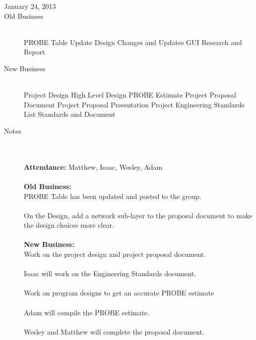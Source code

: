 \documentclass[11pt, letterpaper]{report}
\begin{document}
\begin{description}
\newpage
\item[\Large January 24, 2013]
\hypertarget{January 24, 2013} {}
\item[Old Business] \hfill \\
\subitem PROBE Table Update
\subitem Design Changes and Updates
\subitem GUI Research and Report
\item[New Business] \hfill \\
\subitem Project Design 
\subsubitem High Level Design
\subsubitem PROBE Estimate
\subitem Project Proposal
\subsubitem Document
\subitem Project Proposal Presentation
\subitem Project Engineering Standards
\subsubitem List Standards and Document
\item[Notes] \hfill \\ \hfill \\
\textbf{Attendance:}  Matthew, Isaac, Wesley, Adam\\ \\
\textbf{Old Business:} \\ 
PROBE Table has been updated and posted to the group. \\ \\
On the Design, add a network sub-layer to the proposal document to make the design choices more clear. \\ \\
\textbf{New Business:} \\ 
Work on the project design and project proposal document.\\ \\
Isaac will work on the Engineering Standards document.\\ \\
Work on program designs to get an accurate PROBE estimate\\ \\
Adam will compile the PROBE estimate. \\ \\
Wesley and Matthew will complete the proposal document.



\end{description}
\end{document}
